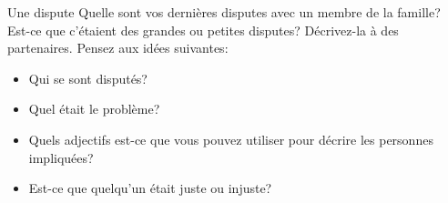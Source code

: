 \begin{frame}{Une dispute}
  Quelle sont vos dernières disputes avec un membre de la famille?
  Est-ce que c'étaient des grandes ou petites disputes?
  Décrivez-la à des partenaires.
  Pensez aux idées suivantes:
  \begin{itemize}
    \item Qui se sont disputés?
    \item Quel était le problème?
    \item Quels adjectifs est-ce que vous pouvez utiliser pour décrire les personnes impliquées?
    \item Est-ce que quelqu'un était juste ou injuste?
  \end{itemize}
\end{frame}